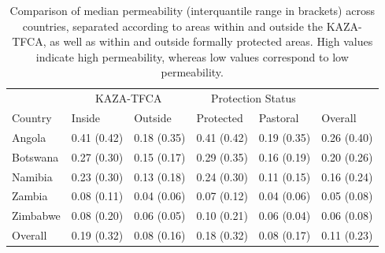 \documentclass[abstract=on,10pt,a4paper,bibliography=totocnumbered]{scrartcl}
\begin{document}
\begin{table}[h]
  \caption{Comparison of median permeability (interquantile range in brackets)
  across countries, separated according to areas within and outside the
  KAZA-TFCA, as well as within and outside formally protected areas. High values
  indicate high permeability, whereas low values correspond to low
  permeability.}
  \label{PermeabilityComp}
  \centering
  \begin{tabular}{llllll}
    \toprule
    \multicolumn{1}{c}{ } & \multicolumn{2}{c}{KAZA-TFCA} & \multicolumn{2}{c}{Protection Status} & \multicolumn{1}{c}{ } \\
    \cmidrule(l{3pt}r{3pt}){2-3} \cmidrule(l{3pt}r{3pt}){4-5}
    Country & Inside & Outside & Protected & Pastoral & Overall\\
    \midrule
    Angola & 0.41 (0.42) & 0.18 (0.35) & 0.41 (0.42) & 0.19 (0.35) & 0.26 (0.40)\\
    Botswana & 0.27 (0.30) & 0.15 (0.17) & 0.29 (0.35) & 0.16 (0.19) & 0.20 (0.26)\\
    Namibia & 0.23 (0.30) & 0.13 (0.18) & 0.24 (0.30) & 0.11 (0.15) & 0.16 (0.24)\\
    Zambia & 0.08 (0.11) & 0.04 (0.06) & 0.07 (0.12) & 0.04 (0.06) & 0.05 (0.08)\\
    Zimbabwe & 0.08 (0.20) & 0.06 (0.05) & 0.10 (0.21) & 0.06 (0.04) & 0.06 (0.08)\\
    \hline
    Overall & 0.19 (0.32) & 0.08 (0.16) & 0.18 (0.32) & 0.08 (0.17) & 0.11 (0.23)\\
    \bottomrule
  \end{tabular}
\end{table}
\end{document}
